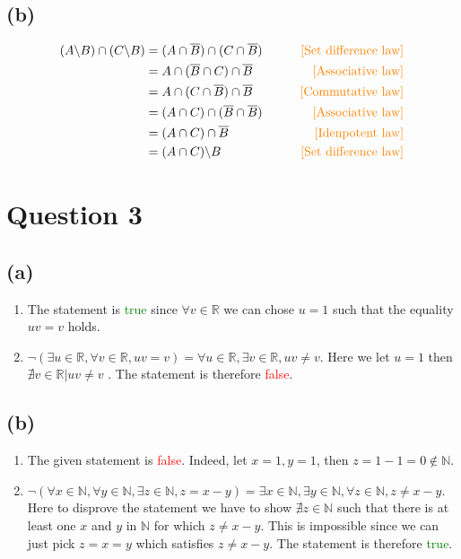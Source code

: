 \documentclass[12pt]{article}
\newcommand{\R}{\mathbb{R}}
\newcommand{\bs}{\backslash}
\theoremstyle{definition}
\theoremstyle{definition}
\theoremstyle{definition}
\theoremstyle{definition}
\theoremstyle{definition}
\theoremstyle{example}
\theoremstyle{note}
\theoremstyle{remark}
\begin{document}
		\subsection*{(b)}
		\begin{align*}
			(A \bs B) \cap (C \bs B) &= (A \cap \overline{B}) \cap (C \cap \overline{B}) \qquad&\textcolor{orange}{[\text{Set difference law}]}\\
			&=A \cap (\overline{B} \cap C) \cap \overline{B} \qquad&\textcolor{orange}{[\text{Associative law}]}\\
			&=A \cap (C \cap \overline{B}) \cap \overline{B} \qquad&\textcolor{orange}{[\text{Commutative law}]}\\
			&=(A \cap C) \cap (\overline{B} \cap \overline{B}) \qquad&\textcolor{orange}{[\text{Associative law}]}\\
			&=(A \cap C) \cap \overline{B} \qquad&\textcolor{orange}{[\text{Idenpotent law}]}\\
			&=(A \cap C) \bs B \qquad&\textcolor{orange}{[\text{Set difference law}]}
 		\end{align*}
		\section*{Question 3}
			\subsection*{(a) }
			\begin{enumerate}[label=(\roman*)]
				\item The statement is \textcolor{green}{true} since $\forall v \in \R$ we can chose $u=1$ such that the equality $uv = v$ holds. 
				\item $\neg(\exists u \in \R , \forall v \in \R, uv=v) = \forall u \in \R , \exists v \in \R, uv \neq v$.  Here we let $u=1$ then $\nexists v \in \R | uv \neq v$ . The statement is therefore \textcolor{red}{false}.
			\end{enumerate}
			\subsection*{(b) }
			\begin{enumerate}[label=(\roman*)]
				\item The given statement is \textcolor{red}{false}. Indeed, let $x=1, y=1$, then $z=1-1=0 \not\in \mathbb{N}$. 
				\item $\neg(\forall x \in \mathbb{N}, \forall y \in \mathbb{N} , \exists z \in \mathbb{N} , z =x-y) = \exists x \in \mathbb{N} , \exists y \in \mathbb{N} , \forall z \in \mathbb{N} , z \neq x -y$. Here to disprove the statement we have to show $\nexists z \in \mathbb{N}$ such that there is at least one $x$ and $y$ in $\mathbb{N}$ for which $z \neq x-y$. This is impossible since we can just pick $z=x=y$ which satisfies $z \neq x-y$. The statement is therefore \textcolor{green}{true}.
			\end{enumerate}
\end{document}
